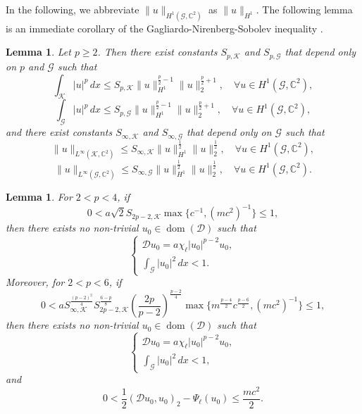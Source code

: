 \documentclass[11pt]{amsart}
\newtheorem{lemma}[theorem]{Lemma}
\newcommand{\abs}[1]{\lvert#1\rvert}
\newcommand{\norm}[1]{\lVert#1\rVert}
\newcommand{\D}{\mathcal{D}}
\newcommand{\G}{\mathcal{G}}
\newcommand{\K}{\mathcal{K}}
\numberwithin{equation}{section}
\begin{document}
In the following, we abbreviate $\norm{u}_{H^1(\G, \mathbb{C}^2)}$ as $\norm{u}_{H^1}$. The following lemma is an immediate corollary of the Gagliardo-Nirenberg-Sobolev inequality \cite[Theorem 1.1]{Ha2}.
\begin{lemma}\label{lemgnsgh1}
Let $p \geq 2$. Then there exist constants $S_{p,\K}$ and $S_{p,\G}$ that depend only on $p$ and $\G$ such that
\[
    \int_{\K} \abs{u}^p\,dx \leq S_{p,\K} \norm{u}_{H^1}^{\frac{p}{2}-1}\norm{u}_2^{\frac{p}{2}+1}, \quad \forall u \in H^1(\G, \mathbb{C}^2),
\]
\[
    \int_{\G} \abs{u}^p\,dx \leq S_{p,\G} \norm{u}_{H^1}^{\frac{p}{2}-1}\norm{u}_2^{\frac{p}{2}+1}, \quad \forall u \in H^1(\G, \mathbb{C}^2),
\]
and there exist constants $S_{\infty,\K}$ and $S_{\infty,\G}$ that depend only on $\G$ such that
\[
 \norm{u}_{L^\infty(\K, \mathbb{C}^2)} \leq S_{\infty,\K} \norm{u}_{H^1}^\frac{1}{2}\norm{u}_2^\frac{1}{2}, \quad \forall u \in H^1(\G, \mathbb{C}^2),
\]
\[
 \norm{u}_{L^\infty(\G, \mathbb{C}^2)} \leq S_{\infty,\G} \norm{u}_{H^1}^\frac{1}{2}\norm{u}_2^\frac{1}{2}, \quad \forall u \in H^1(\G, \mathbb{C}^2).
\]
\end{lemma}
\begin{lemma}\label{lempin26}
    For $2<p < 4$, if
    \begin{equation}\label{eqapppin24}
         0<a\sqrt2S_{2p-2,\K}\max\{c^{-1},(mc^2)^{-1}\}\leq 1,
    \end{equation}
then there exists no non-trivial $u_{0} \in \operatorname{dom}(\D)$ such that
    $$
\left\{\begin{array}{l}
\D u_{0}=a\chi_{\ell}\abs{u_{0}}^{p-2} u_{0}, \\
\int_{\G}\left|u_{0}\right|^{2} \,dx < 1.
\end{array}\right.
$$
Moreover, for $2< p < 6$, if
    \begin{equation}\label{eqapppin46}
         0<a S_{\infty,\K}^\frac{(p-2)^2}{4}S_{2p-2,\K}^\frac{6-p}{8}\left(\frac{2p}{p-2}\right)^\frac{p-2}{4} \max\{m^\frac{p-4}{2}c^\frac{p-6}{2},(mc^2)^{-1}\}\leq 1,
    \end{equation}
then there exists no non-trivial $u_{0} \in \operatorname{dom}(\D)$ such that
    $$
\left\{\begin{array}{l}
\D u_{0}=a\chi_{\ell}\abs{u_{0}}^{p-2} u_{0}, \\
\int_{\G}\left|u_{0}\right|^{2} \,dx < 1,
\end{array}\right.
$$
and
$$
0<\frac{1}{2}(\D u_{0}, u_{0})_{2}-\Psi_\ell(u_{0})\leq \frac{mc^2}{2}.
$$
\end{lemma}
\end{document}
